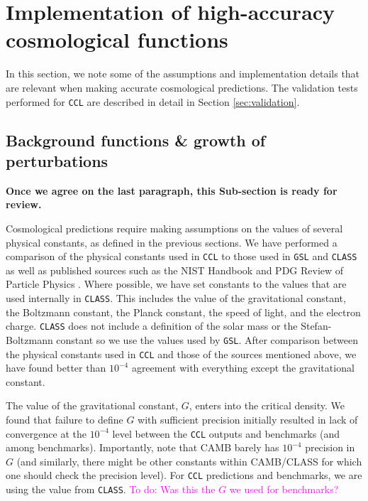 \documentclass[\docopts]{\docclass}
\newcommand{\todo}[1]{\textcolor{magenta}{To do: #1}}
\newcommand{\ccl}{{\tt CCL}\xspace}
\begin{document}
\section{Implementation of high-accuracy cosmological functions}
\label{sec:implement}

In this section, we note some of the assumptions and implementation details that are relevant when making accurate cosmological predictions. The validation tests performed for {\tt CCL} are described in detail in Section \ref{sec:validation}.

\subsection{Background functions \& growth of perturbations}
\label{sec:distances}
{\textcolor{red!55!blue}{\bf Once we agree on the last paragraph, this Sub-section is ready for review.}}

Cosmological predictions require making assumptions on the values of several physical constants, as defined in the previous sections. We have performed a comparison of the physical constants used in \ccl to those used in {\tt GSL} and {\tt CLASS} as well as published sources such as the NIST Handbook and PDG Review of Particle Physics \citep{Beringer:1900zz}. Where possible, we have set constants to the values that are used internally in {\tt CLASS}. This includes the value of the gravitational constant, the Boltzmann constant, the Planck constant, the speed of light, and the electron charge. {\tt CLASS} does not include a definition of the solar mass or the Stefan-Boltzmann constant so we use the values used by {\tt GSL}. After comparison between the physical constants used in \ccl and those of the sources mentioned above, we have found better than $10^{-4}$ agreement with everything except the gravitational constant.

The value of the gravitational constant, $G$, enters into the critical density. We found that failure to define $G$ with sufficient precision initially resulted in lack of convergence at the $10^{-4}$ level between the \ccl outputs and benchmarks (and among benchmarks). Importantly, note that CAMB barely has $10^{-4}$ precision in $G$ (and similarly, there might be other constants within CAMB/CLASS for which one should check the precision level). For \ccl predictions and benchmarks, we are using the value from {\tt CLASS}. \todo{Was this the $G$ we used for benchmarks?} 
\end{document}
